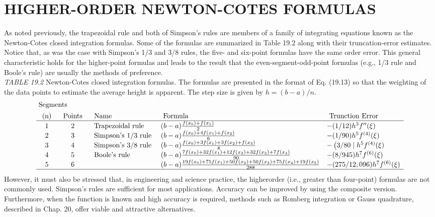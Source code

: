 \documentclass[../main.tex]{subfiles}
\begin{document}
\section{ HIGHER-ORDER NEWTON-COTES FORMULAS}
As noted previously, the trapezoidal rule and both of Simpson's rules are members of a
family of integrating equations known as the Newton-Cotes closed integration formulas.
Some of the formulas are summarized in Table 19.2 along with their truncation-error
estimates.\\
Notice that, as was the case with Simpson's 1/3 and 3/8 rules, the five- and six-point
formulas have the same order error. This general characteristic holds for the higher-point
formulas and leads to the result that the even-segment-odd-point formulas (e.g., 1/3 rule
and Boole's rule) are usually the methods of preference.
\\\textit{TABLE 19.2} Newton-Cotes closed integration formulas. The formulas are presented in the format of Eq. (19.13) so that the weighting of the data points to estimate the average height is apparent. The step size is given by $h=(b-a) / n$.
$$
\begin{aligned}
&\text { Segments }\\
&\begin{array}{cclll}
\text { (n) } & \text { Points } & \text { Name } & \text { Formula } & \text { Trunction Error } \\
\hline 1 & 2 & \text { Trapezoidal rule } &(b-a) \frac{f\left(x_{0}\right)+f\left(x_{1}\right)}{2} &-(1 / 12) h^{3} f^{\prime \prime}(\xi)\\
2 & 3 & \text { Simpson's } 1 / 3 \text { rule } &(b-a) \frac{f\left(x_{0}\right)+4 f\left(x_{1}\right)+f\left(x_{2}\right)}{6} &-(1 / 90) h^{5} f^{(4)}(\xi)\\
3 & 4 & \text { Simpson's } 3 / 8 \text { rule } &(b-a) \frac{f\left(x_{0}\right)+3 f\left(x_{1}\right)+3 f\left(x_{2}\right)+f\left(x_{3}\right)}{8} &-\left(3 / 80 \mid h^{5} f^{(4)}(\xi)\right.\\
4 & 5 & \text { Boole's rule } &(b-a) \frac{7 f\left(x_{0}\right)+32 f\left(x_{1}\right)+12 f\left(x_{2}\right)+32 f\left(x_{3}\right)+7 f\left(x_{4}\right)}{90} &-(8 / 945) h^{7} f^{(6)}(\xi)\\
5 & 6 & &(b-a) \frac{19 f\left(x_{0}\right)+75 f\left(x_{1}\right)+50 f\left(x_{2}\right)+50 f\left(x_{3}\right)+75 f\left(x_{4}\right)+19 f\left(x_{5}\right)}{288} &-(275 / 12,096) h^{7} f^{(6)}(\xi)\\
\hline
\end{array}
\end{aligned}
$$
However, it must also be stressed that, in engineering and science practice, the higherorder (i.e., greater than four-point) formulas are not commonly used. Simpson's rules are
sufficient for most applications. Accuracy can be improved by using the composite version.
Furthermore, when the function is known and high accuracy is required, methods such as
Romberg integration or Gauss quadrature, described in Chap. 20, offer viable and attractive alternatives.
\vspace{1cm}
\end{document}
